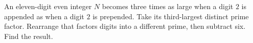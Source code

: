An eleven-digit even integer $N$ becomes three times as large when a digit $2$ is appended as when a digit $2$ is prepended. Take its third-largest distinct prime factor. Rearrange that factor\textquotesingle s digits into a different prime, then subtract six. Find the result.

